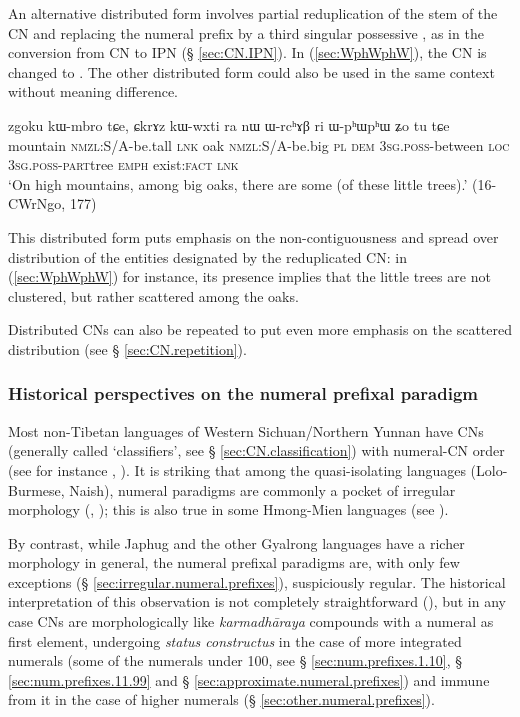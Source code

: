 An alternative distributed form involves partial reduplication of the stem of the CN and replacing the numeral prefix by a third singular possessive , as in the conversion from CN to IPN (§ \ref{sec:CN.IPN}). In (\ref{sec:WphWphW}), the CN  is changed to . The other distributed form  could also be used in the same context without meaning difference. 

\begin{exe}
\ex \label{sec:WphWphW}
\gll zgoku kɯ-mbro tɕe, ɕkrɤz kɯ-wxti ra nɯ ɯ-rcʰɤβ ri ɯ-pʰɯ\redp{}pʰɯ ʑo tu tɕe \\
mountain \textsc{nmzl}:S/A-be.tall \textsc{lnk} oak \textsc{nmzl}:S/A-be.big \textsc{pl} \textsc{dem} \textsc{3sg}.\textsc{poss}-between \textsc{loc} \textsc{3sg}.\textsc{poss}-\textsc{part}\redp{}tree \textsc{emph} exist:\textsc{fact} \textsc{lnk} \\
\glt `On high mountains, among big oaks, there are some (of these little trees).' (16-CWrNgo, 177)
\end{exe}   

This distributed form puts emphasis on the non-contiguousness and spread over distribution of the entities designated by the reduplicated CN: in (\ref{sec:WphWphW}) for instance, its presence implies that the little trees are not clustered, but rather scattered among the oaks.

Distributed CNs can also be repeated to put even more emphasis on the scattered distribution (see § \ref{sec:CN.repetition}).

\subsubsection{Historical perspectives on the numeral prefixal paradigm} \label{sec:num.prefix.paradigm.history}
Most non-Tibetan languages of Western Sichuan/Northern Yunnan have CNs (generally called `classifiers', see § \ref{sec:CN.classification}) with numeral-CN order (see for instance \citealt{zhang14classifiers}, \citealt[163-194]{michaud17yongning}).  It is striking that among the quasi-isolating languages (Lolo-Burmese, Naish), numeral paradigms are commonly a pocket of irregular morphology (\citealt{bradley05numerals}, \citealt{michaud11cl}); this is also true in some Hmong-Mien  languages (see \citealt{gerner10classifier.isolating}).

By contrast, while Japhug and the other Gyalrong languages have a richer morphology in general, the numeral prefixal paradigms are, with only few exceptions (§ \ref{sec:irregular.numeral.prefixes}), suspiciously regular. The historical interpretation of this observation is not completely straightforward (\citealt{jacques17num}), but in any case CNs are morphologically like \textit{karmadhāraya} compounds with a numeral as first element, undergoing \textit{status constructus} in the case of more integrated numerals (some of the numerals under 100, see § \ref{sec:num.prefixes.1.10},  § \ref{sec:num.prefixes.11.99} and § \ref{sec:approximate.numeral.prefixes}) and immune from it in the case of higher numerals (§ \ref{sec:other.numeral.prefixes}).

